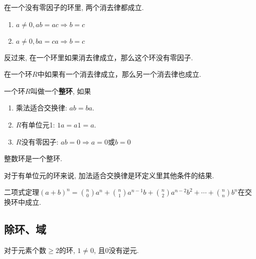\begin{Theorem}
在一个没有零因子的环里, 两个消去律都成立.
\begin{enumerate}
	\item $a \neq \mathfrak{0}, ab = ac \Rightarrow b = c$
	\item $a \neq \mathfrak{0}, ba = ca \Rightarrow b = c$
\end{enumerate}
反过来, 在一个环里如果\;\;消去律成立，那么这个环没有零因子.
\end{Theorem}

\begin{Corollary}
在一个环$R$中如果有一个消去律成立，那么另一个消去律也成立.
\end{Corollary}

\begin{Definition}[整环]
一个环$R$叫做一个\textbf{整环}, 如果
\begin{enumerate}
	\item 乘法适合交换律: $ab = ba$.
	\item $R$有单位元1: $\mathfrak{1}a = a\mathfrak{1} = a$.
	\item $R$没有零因子: $ab = \mathfrak{0} \Rightarrow a = \mathfrak{0}$或$b = \mathfrak{0}$
\end{enumerate}
\end{Definition}

\begin{Proposition}
整数环是一个整环.
\end{Proposition}

\begin{Proposition}
对于有单位元的环来说, 加法适合交换律是环定义里其他条件的结果.
\end{Proposition}

\begin{Proposition}
二项式定理$\displaystyle (a + b)^n = \binom{n}{0} a^n + \binom{n}{1} a^{n-1}b + \binom{n}{2} a^{n-2}b^2 + \cdots + \binom{n}{n} b^n$在交换环中成立.
\end{Proposition}


\subsection{除环、域} %

\begin{Proposition}
对于元素个数$\ge 2$的环, $\mathfrak{1} \neq \mathfrak{0}$, 且$\mathfrak{0}$没有逆元.
\end{Proposition}

